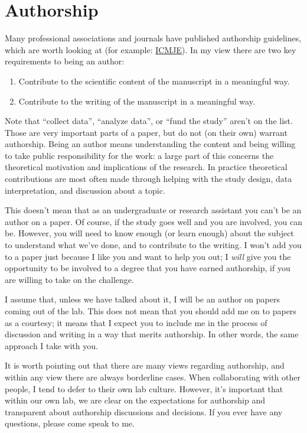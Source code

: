 \documentclass[letterpaper,12pt,oneside]{memoir}
\begin{document}
\section{Authorship}
Many professional associations and journals have published authorship guidelines, which are worth looking at (for example: \href{http://www.icmje.org/recommendations/browse/roles-and-responsibilities/defining-the-role-of-authors-and-contributors.html}{ICMJE}). In my view there are two key requirements to being an author:

\begin{enumerate}
\item{Contribute to the scientific content of the manuscript in a meaningful way.}
\item{Contribute to the writing of the manuscript in a meaningful way.}
\end{enumerate}

Note that ``collect data'', ``analyze data'', or ``fund the study'' aren't on the list. Those are very important parts of a paper, but do not (on their own) warrant authorship. Being an author means understanding the content and being willing to take public responsibility for the work: a large part of this concerns the theoretical motivation and implications of the research. In practice theoretical contributions are most often made through helping with the study design, data interpretation, and discussion about a topic.

This doesn't mean that as an undergraduate or research assistant you can't be an author on a paper. Of course, if the study goes well and you are involved, you can be. However, you will need to know enough (or learn enough) about the subject to understand what we've done, and to contribute to the writing. I won't add you to a paper just because I like you and want to help you out; I {\itshape will} give you the opportunity to be involved to a degree that you have earned authorship, if you are willing to take on the challenge.

I assume that, unless we have talked about it, I will be an author on papers coming out of the lab. This does not mean that you should add me on to papers as a courtesy; it means that I expect you to include me in the process of discussion and writing in a way that merits authorship. In other words, the same approach I take with you.

It is worth pointing out that there are many views regarding authorship, and within any view there are always borderline cases. When collaborating with other people, I tend to defer to their own lab culture. However, it's important that within our own lab, we are clear on the expectations for authorship and transparent about authorship discussions and decisions. If you ever have any questions, please come speak to me.
\end{document}
